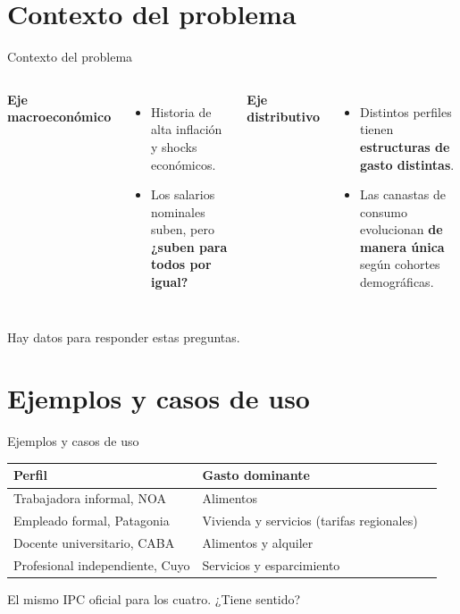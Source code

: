 \documentclass{beamer}
\begin{document}
\section{Contexto del problema}
\begin{frame}{Contexto del problema}
    \begin{columns}
        \textbf{Eje macroeconómico}
        \begin{itemize}
            \item Historia de alta inflación y shocks económicos.
            \item Los salarios nominales suben, pero 
            \textbf{¿suben para todos por igual?}
        \end{itemize}

        \textbf{Eje distributivo}
        \begin{itemize}
            \item Distintos perfiles tienen \textbf{estructuras de gasto distintas}.
            \item Las canastas de consumo evolucionan \textbf{de manera única} según cohortes demográficas.
        \end{itemize}
    \end{columns}
    \vspace{0.5em}
    \begin{block}{}
        Hay datos para responder estas preguntas.
    \end{block}
\end{frame}

\section{Ejemplos y casos de uso}
\begin{frame}{Ejemplos y casos de uso}

    \begin{table}
        \centering
        \small
        \begin{tabular}{lll}
            \hline
            \textbf{Perfil} & \textbf{Gasto dominante}\\
            \hline
            Trabajadora informal, NOA & Alimentos\\
            Empleado formal, Patagonia & Vivienda y servicios (tarifas regionales) \\
            Docente universitario, CABA & Alimentos y alquiler\\
            Profesional independiente, Cuyo & Servicios y esparcimiento\\
            \hline
        \end{tabular}
    \end{table}

    \vspace{0.5em}
    \begin{block}{}
        El mismo IPC oficial para los cuatro. ¿Tiene sentido?
    \end{block}

\end{frame}
\end{document}
